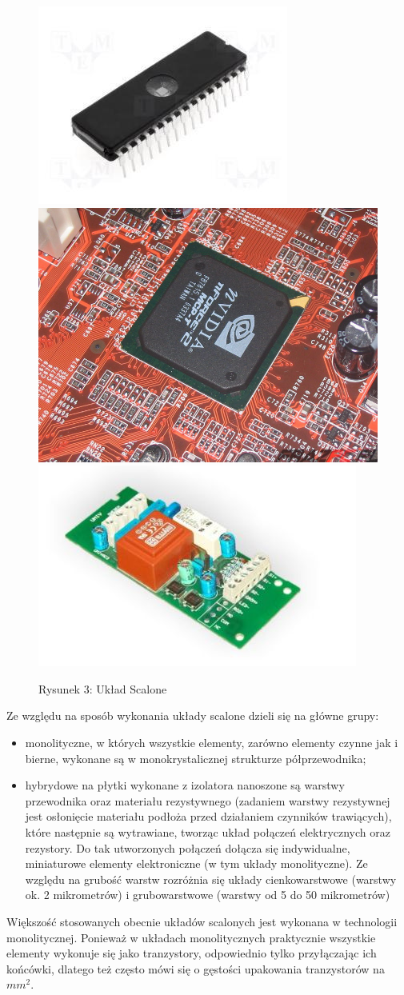 \documentclass[a4paper,11pt]{article}
\begin{document}
\begin{figure}[!htb]
\includegraphics[width=0.3\linewidth]{uklad1.jpg}
\includegraphics[width=0.3\linewidth]{uklad2.jpg}
\includegraphics[width=0.3\linewidth]{uklad3.jpg}
\caption{Rysunek 3: Układ Scalone}
\label{fig:ukladScalone}
\end{figure}


 Ze względu na sposób wykonania układy scalone dzieli się na główne grupy:
\begin{itemize}
\item monolityczne, w których wszystkie elementy, zarówno elementy czynne jak i bierne, wykonane są w monokrystalicznej strukturze półprzewodnika; 
\item hybrydowe na płytki wykonane z izolatora nanoszone są warstwy przewodnika oraz materiału rezystywnego (zadaniem warstwy rezystywnej jest osłonięcie materiału podłoża przed działaniem czynników trawiących), które następnie są wytrawiane, tworząc układ połączeń elektrycznych oraz rezystory. Do tak utworzonych połączeń dołącza się indywidualne, miniaturowe elementy elektroniczne (w tym układy monolityczne). Ze względu na grubość warstw rozróżnia się układy cienkowarstwowe (warstwy ok. 2 mikrometrów) i grubowarstwowe (warstwy od 5 do 50 mikrometrów)
\end{itemize}


 Większość stosowanych obecnie układów scalonych jest wykonana w technologii monolitycznej. Ponieważ w układach monolitycznych praktycznie wszystkie elementy wykonuje się jako tranzystory, odpowiednio tylko przyłączając ich końcówki, dlatego też często mówi się o gęstości upakowania tranzystorów na $mm^2$. 
\end{document}
